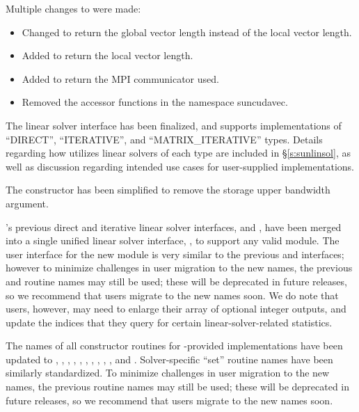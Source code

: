 \noindent Multiple changes to {\nvecraja} were made:
\begin{itemize}
  \item Changed  to return the global vector length instead of
    the local vector length.

  \item Added  to return the local vector length.
  
  \item Added  to return the MPI communicator used.

  \item Removed the accessor functions in the namespace suncudavec.
\end{itemize}

The {\kinls} linear solver interface has been finalized, and supports
{\sunlinsol} implementations of ``DIRECT'', ``ITERATIVE'', and
``MATRIX\_ITERATIVE'' types.  Details regarding how {\kinls} utilizes linear
solvers of each type are included in \S\ref{s:sunlinsol}, as
well as discussion regarding intended use cases for user-supplied
{\sunlinsol} implementations.

The  constructor has been simplified to remove the
storage upper bandwidth argument.

{\kinsol}'s previous direct and iterative linear solver interfaces,
{\kindls} and {\kinspils}, have been merged into a single unified linear
solver interface, {\kinls}, to support any valid {\sunlinsol} module.
The user interface for the new {\kinls} module is very similar to the
previous {\kindls} and {\kinspils} interfaces; however to minimize
challenges in user migration to the new names, the previous {\CC} and
{\F} routine names may still be used; these will be deprecated in
future releases, so we recommend that users migrate to the new names
soon.  We do note that {\F} users, however, may need to enlarge their
 array of optional integer outputs, and update the indices
that they query for certain linear-solver-related statistics.

The names of all constructor routines for {\sundials}-provided
{\sunlinsol} implementations have been updated to
,
,
,
, \newline
{},
,
,
,
,
, and
.  Solver-specific ``set'' routine names have
been similarly standardized.  To minimize challenges in user migration
to the new names, the previous routine names may still be used; these
will be deprecated in future releases, so we recommend that users
migrate to the new names soon.

